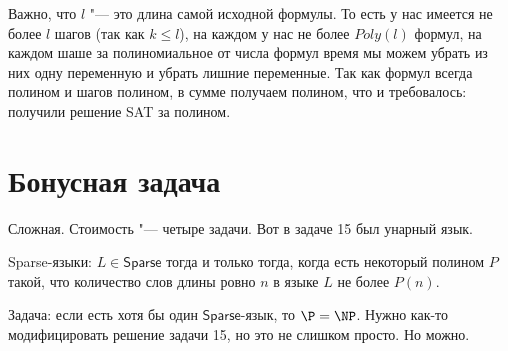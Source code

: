 	Важно, что $l$ "--- это длина самой исходной формулы.
	То есть у нас имеется не более $l$ шагов (так как $k \le l$), на каждом у нас не более
	$Poly(l)$ формул, на каждом шаше за полиномиальное от числа формул время мы можем убрать из
	них одну переменную и убрать лишние переменные.
	Так как формул всегда полином и шагов полином, в сумме получаем полином, что и требовалось:
	получили решение SAT за полином.

\section{Бонусная задача}
	Сложная. Стоимость "--- четыре задачи.
	Вот в задаче 15 был унарный язык.
	\begin{Def}
		Sparse-языки: $L \in \mathsf{Sparse}$ тогда и только тогда, когда есть некоторый
		полином $P$ такой, что количество слов длины ровно $n$ в языке $L$ не более
		$P(n)$.
	\end{Def}
	Задача: если есть хотя бы один $\mathsf{Sparse}$-язык, то $\P=\NP$.
	Нужно как-то модифицировать решение задачи 15, но это не слишком просто.
	Но можно.
